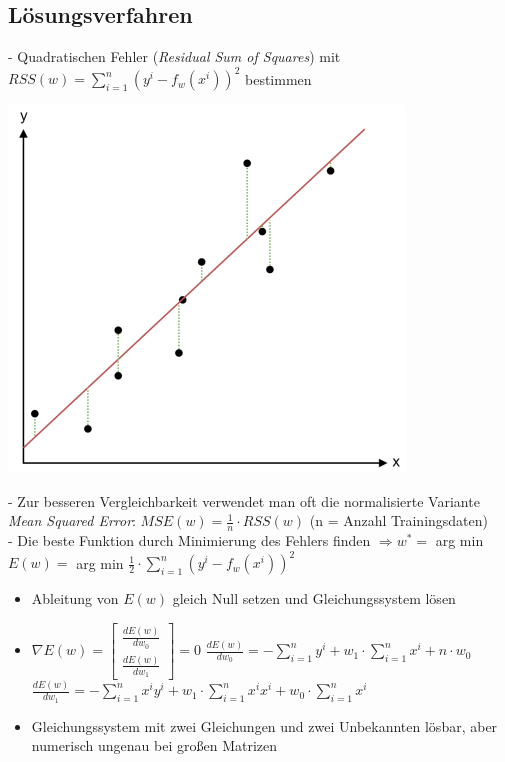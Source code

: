 \documentclass{report}
\begin{document}
  \subsection{Lösungsverfahren}	
  - Quadratischen Fehler (\textit{Residual Sum of Squares}) mit\\	
  $RSS(w) = \sum_{i=1}^n(y^i - f_w(x^i))^2$ bestimmen	
  \begin{center}	
    \includegraphics[scale=0.35]{ml02_2}	
  \end{center}	
  - Zur besseren Vergleichbarkeit verwendet man oft die normalisierte Variante\\	
  \textit{Mean Squared Error}: $MSE(w) = \frac{1}{n}\cdot RSS(w)$ (n = Anzahl Trainingsdaten)\\	
  - Die beste Funktion durch Minimierung des Fehlers finden	
  $\Rightarrow w^* =$ arg min $E(w) =$ arg min $\frac{1}{2}\cdot \sum_{i=1}^n(y^i - f_w(x^i))^2$\\	
  \vspace*{-1.25em}	
  \begin{itemize}	
    \item Ableitung von $E(w)$ gleich Null setzen und Gleichungssystem lösen	
    \item $\nabla E(w) = \begin{bmatrix}\frac{dE(w)}{dw_0}\\\frac{dE(w)}{dw_1}\end{bmatrix} = 0$	
    \subitem $\frac{dE(w)}{dw_0} = -\sum_{i=1}^ny^i + w_1\cdot \sum_{i=1}^nx^i + n\cdot w_0$	
    \subitem $\frac{dE(w)}{dw_1} = -\sum_{i=1}^nx^iy^i + w_1\cdot \sum_{i=1}^nx^ix^i + w_0\cdot \sum_{i=1}^nx^i$	
    \item Gleichungssystem mit zwei Gleichungen und zwei Unbekannten lösbar, aber numerisch ungenau bei großen Matrizen 	
  \end{itemize}	
  
\end{document}
